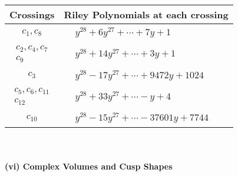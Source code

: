 \documentclass[1p]{elsarticle_modified}
\theoremstyle{definition}
\begin{document}
\begin{tabular}{m{50pt}|m{274pt}}
Crossings & \hspace{64pt}Riley Polynomials at each crossing \\
\hline $$\begin{aligned}c_{1},c_{8}\end{aligned}$$&$\begin{aligned}
&y^{28}+6 y^{27}+\cdots+7 y+1
\end{aligned}$\\
\hline $$\begin{aligned}c_{2},c_{4},c_{7}\\c_{9}\end{aligned}$$&$\begin{aligned}
&y^{28}+14 y^{27}+\cdots+3 y+1
\end{aligned}$\\
\hline $$\begin{aligned}c_{3}\end{aligned}$$&$\begin{aligned}
&y^{28}-17 y^{27}+\cdots+9472 y+1024
\end{aligned}$\\
\hline $$\begin{aligned}c_{5},c_{6},c_{11}\\c_{12}\end{aligned}$$&$\begin{aligned}
&y^{28}+33 y^{27}+\cdots- y+4
\end{aligned}$\\
\hline $$\begin{aligned}c_{10}\end{aligned}$$&$\begin{aligned}
&y^{28}-15 y^{27}+\cdots-37601 y+7744
\end{aligned}$\\
\hline
\end{tabular}\\~\\
\newpage\flushleft \textbf{(vi) Complex Volumes and Cusp Shapes}
\end{document}
